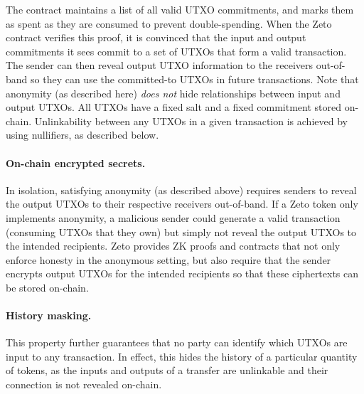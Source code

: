 The contract maintains a list of all valid UTXO commitments, and marks them as spent as they are consumed to prevent double-spending. When the Zeto contract verifies this proof, it is convinced that the input and output commitments it sees commit to a set of UTXOs that form a valid transaction. The sender can then reveal output UTXO information to the receivers out-of-band so they can use the committed-to UTXOs in future transactions. Note that anonymity (as described here) \textit{does not} hide relationships between input and output UTXOs. All UTXOs have a fixed salt and a fixed commitment stored on-chain. Unlinkability between any UTXOs in a given transaction is achieved by using nullifiers, as described below.


\paragraph{On-chain encrypted secrets.} In isolation, satisfying anonymity (as described above) requires senders to reveal the output UTXOs to their respective receivers out-of-band. If a Zeto token only implements anonymity, a malicious sender could generate a valid transaction (consuming UTXOs that they own) but simply not reveal the output UTXOs to the intended recipients. Zeto provides ZK proofs and contracts that not only enforce honesty in the anonymous setting, but also require that the sender encrypts output UTXOs for the intended recipients so that these ciphertexts can be stored on-chain.


\paragraph{History masking.} This property further guarantees that no party can identify which UTXOs are input to any transaction. In effect, this hides the history of a particular quantity of tokens, as the inputs and outputs of a transfer are unlinkable and their connection is not revealed on-chain.

